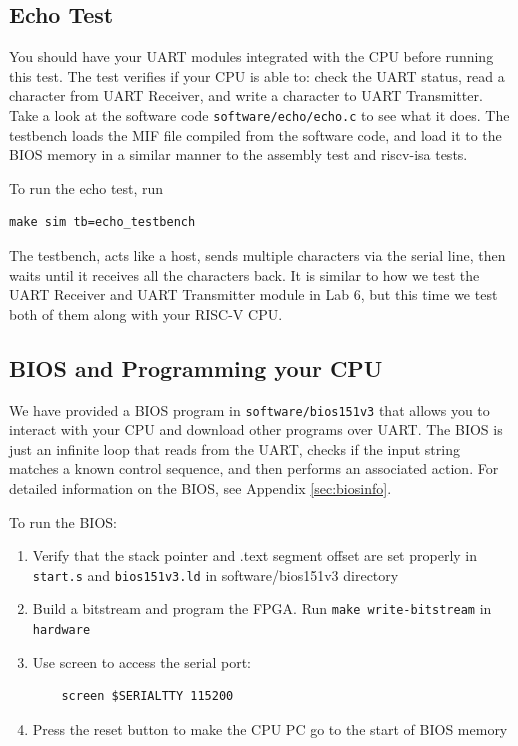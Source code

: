 \documentclass[11pt]{article}
\begin{document}
\subsection{Echo Test}

You should have your UART modules integrated with the CPU before running this test. The test verifies if your CPU is able to: check the UART status, read a character from UART Receiver, and write a character to UART Transmitter. Take a look at the software code \verb|software/echo/echo.c| to see what it does. The testbench loads the MIF file compiled from the software code, and load it to the BIOS memory in a similar manner to the assembly test and riscv-isa tests.

To run the echo test, run

\begin{verbatim}
make sim tb=echo_testbench
\end{verbatim}

The testbench, acts like a host, sends multiple characters via the serial line, then waits until it receives all the characters back. It is similar to how we test the UART Receiver and UART Transmitter module in Lab 6, but this time we test both of them along with your RISC-V CPU.

\subsection{BIOS and Programming your CPU}
\label{bios_info}

We have provided a BIOS program in \verb|software/bios151v3| that allows you to interact with your CPU and download other programs over UART.
The BIOS is just an infinite loop that reads from the UART, checks if the input string matches a known control sequence, and then performs an associated action.
For detailed information on the BIOS, see Appendix \ref{sec:biosinfo}.

To run the BIOS:
\begin{enumerate}
  \item Verify that the stack pointer and .text segment offset are set properly in \verb|start.s| and \verb|bios151v3.ld| in software/bios151v3 directory
  \item Build a bitstream and program the FPGA. Run \verb|make write-bitstream| in \verb|hardware|
  \item Use screen to access the serial port:
    \begin{verbatim}
    screen $SERIALTTY 115200
    \end{verbatim}
  \item Press the reset button to make the CPU PC go to the start of BIOS memory
\end{enumerate}
\end{document}
